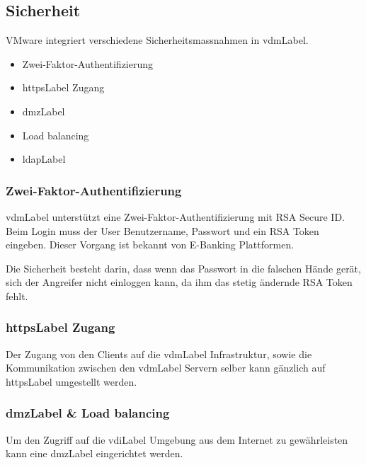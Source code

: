 \subsection{Sicherheit}
VMware integriert verschiedene Sicherheitsmassnahmen in \Gls{vdmLabel}.

\begin{itemize}
\item Zwei-Faktor-Authentifizierung
\item \Gls{httpsLabel} Zugang
\item \Gls{dmzLabel}
\item Load balancing
\item \Gls{ldapLabel}
\end{itemize}

\subsubsection{Zwei-Faktor-Authentifizierung}
\Gls{vdmLabel} unterstützt eine Zwei-Faktor-Authentifizierung mit RSA Secure ID. Beim Login muss der User Benutzername, Passwort und ein RSA Token eingeben. Dieser Vorgang ist bekannt von E-Banking Plattformen. 

Die Sicherheit besteht darin, dass wenn das Passwort in die falschen Hände gerät, sich der Angreifer nicht einloggen kann, da ihm das stetig ändernde RSA Token fehlt.

\subsubsection{\Gls{httpsLabel} Zugang}
Der Zugang von den Clients auf die \Gls{vdmLabel} Infrastruktur, sowie die Kommunikation zwischen den \Gls{vdmLabel} Servern selber kann gänzlich auf \Gls{httpsLabel} umgestellt werden.

\subsubsection{\Gls{dmzLabel} \& Load balancing}
Um den Zugriff auf die \Gls{vdiLabel} Umgebung aus dem Internet zu gewährleisten kann eine \Gls{dmzLabel} eingerichtet werden. 

